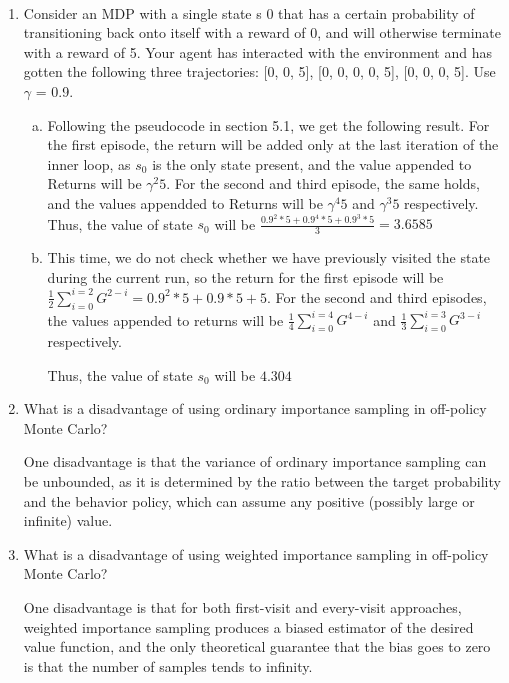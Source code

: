 \documentclass{exam}
\begin{document}
\begin{problem}
\ \newline
\begin{enumerate}
    \item Consider an MDP with a single state s 0 that has a certain probability of transitioning back onto itself with a reward of 0, and will otherwise terminate with a reward of 5. Your agent has interacted with the environment and has gotten the following three trajectories: [0, 0, 5], [0, 0, 0, 0, 5], [0, 0, 0, 5]. Use $\gamma$ = 0.9.
    \begin{solutionorlines}[2in]
    \begin{enumerate} [(a)]
        \item
        Following the pseudocode in section 5.1, we get the following result.
        For the first episode, the return will be added only at the last iteration of the inner loop, as $s_0$ is the only state present, and the value appended to Returns will be $\gamma^2 5$. For the second and third episode, the same holds, and the values appendded to Returns will be $\gamma^4 5$ and $\gamma^3 5$ respectively. Thus, the value of state $s_0$ will be $\frac{0.9^2 * 5 + 0.9^4 * 5 + 0.9^3 * 5}{3} = 3.6585$ 
        \item
            This time, we do not check whether we have previously visited the state during the current run, so the return for the first episode will be $\frac{1}{2} \sum_{i=0}^{i=2} G^{2-i} = 0.9^2 * 5 + 0.9 * 5 + 5$. For the second and third episodes, the values appended to returns will be $\frac{1}{4}\sum_{i=0}^{i=4} G^{4-i}$ and $\frac{1}{3}\sum_{i=0}^{i=3} G^{3-i}$ respectively.
            
            Thus, the value of state $s_0$ will be $4.304$
    \end{enumerate}
    \end{solutionorlines}
    
    \item What is a disadvantage of using ordinary importance sampling in off-policy Monte Carlo?
        \begin{solutionorlines}[2in]
        One disadvantage is that the variance of ordinary importance sampling can be unbounded, as it is determined by the ratio between the target probability and the behavior policy, which can assume any positive (possibly large or infinite) value.
    \end{solutionorlines}
    
    \item What is a disadvantage of using weighted importance sampling in off-policy Monte Carlo?
    \begin{solutionorlines}[2in]
    One disadvantage is that for both first-visit and every-visit approaches, weighted importance sampling produces a biased estimator of the desired value function, and the only theoretical guarantee that the bias goes to zero is that the number of samples tends to infinity. 
\end{solutionorlines}
\end{enumerate}

\end{problem}
\end{document}
